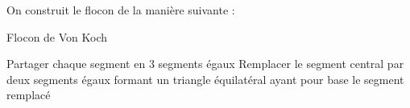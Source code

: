 			On construit le flocon de la manière suivante :

			\begin{algorithm}[H]
			\DontPrintSemicolon
			\caption{Flocon de Von Koch}
				{
					Partager chaque segment en 3 segments égaux\;
					Remplacer le segment central par deux segments égaux formant un triangle équilatéral ayant pour base le segment remplacé\;
				}
			\end{algorithm}


